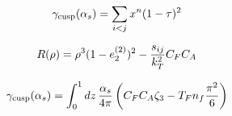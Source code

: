 \begin{equation}
  \gamma_{\rm cusp}(\alpha_s) = \sum_{i<j} {x}^{n} (1 - \tau)^{2}
  \label{eq:1}
\end{equation}

\begin{equation}
  R(\rho) = {\rho}^{3} (1 - e_2^{(2)})^{2} - \frac{s_{ij}}{k_T^2} C_F C_A
  \label{eq:2}
\end{equation}

\begin{equation}
  \gamma_{\rm cusp}(\alpha_s) = \int_0^1 dz \, \frac{\alpha_s}{4\pi} \left( C_F C_A \zeta_{3} - T_F n_f \frac{\pi^2}{6} \right)
  \label{eq:3}
\end{equation}

